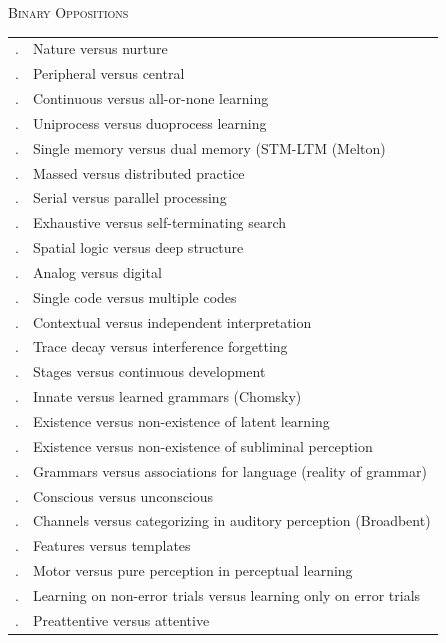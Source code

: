 \documentclass{paper}
\newcounter{magicrownumbers}[figure]
\newcommand\rownumber{\stepcounter{magicrownumbers}\arabic{magicrownumbers}.}
\begin{document}
\begin{table}[!b]
\begin{center}
\textsc{Binary Oppositions}\\
\vspace{2ex}

\footnotesize
\begin{tabular}{l l}
\rownumber & Nature versus nurture \\
\rownumber & Peripheral versus central \\
\rownumber & Continuous versus all-or-none learning \\ 
\rownumber & Uniprocess versus duoprocess learning \\
\rownumber & Single memory versus dual memory (STM-LTM (Melton) \\
\rownumber & Massed versus distributed practice \\
\rownumber & Serial versus parallel processing \\
\rownumber & Exhaustive versus self-terminating search \\
\rownumber & Spatial logic versus deep structure \\
\rownumber & Analog versus digital \\
\rownumber & Single code versus multiple codes \\
\rownumber & Contextual versus independent interpretation \\
\rownumber & Trace decay versus interference forgetting \\
\rownumber & Stages versus continuous development \\
\rownumber & Innate versus learned grammars (Chomsky) \\
\rownumber & Existence versus non-existence of latent learning \\
\rownumber & Existence versus non-existence of subliminal perception \\
\rownumber & Grammars versus associations for language (reality of grammar) \\
\rownumber & Conscious versus unconscious \\
\rownumber & Channels versus categorizing in auditory perception (Broadbent) \\
\rownumber & Features versus templates \\
\rownumber & Motor versus pure perception in perceptual learning \\
\rownumber & Learning on non-error trials versus learning only on error trials \\
\rownumber & Preattentive versus attentive \\
\end{tabular}
\end{center}
\label{oppofig}
\end{table}
\end{document}
